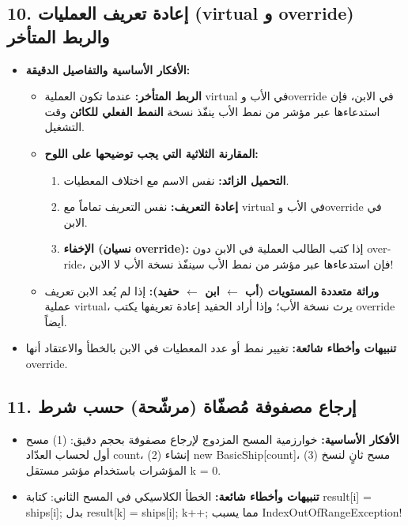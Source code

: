 \documentclass[14pt]{extarticle}
\begin{document}
\filbreak
\subsection*{10. إعادة تعريف العمليات (\textenglish{virtual} و \textenglish{override}) والربط المتأخر}
\begin{itemize}[itemsep=0.3em]
    \item \textbf{الأفكار الأساسية والتفاصيل الدقيقة:}
    \begin{itemize}
        \item \textbf{الربط المتأخر:} عندما تكون العملية \textenglish{virtual} في الأب و\textenglish{override} في الابن، فإن استدعاءها عبر مؤشر من نمط الأب ينفّذ نسخة \textbf{النمط الفعلي للكائن} وقت التشغيل.
        \item \textbf{المقارنة الثلاثية التي يجب توضيحها على اللوح:}
        \begin{enumerate}
            \item \textbf{التحميل الزائد:} نفس الاسم مع اختلاف المعطيات.
            \item \textbf{إعادة التعريف:} نفس التعريف تماماً مع \textenglish{virtual} في الأب و\textenglish{override} في الابن.
            \item \textbf{الإخفاء (نسيان \textenglish{override}):} إذا كتب الطالب العملية في الابن دون \textenglish{override}، فإن استدعاءها عبر مؤشر من نمط الأب سينفّذ نسخة الأب لا الابن!
        \end{enumerate}
        \item \textbf{وراثة متعددة المستويات (أب $\leftarrow$ ابن $\leftarrow$ حفيد):} إذا لم يُعد الابن تعريف عملية \textenglish{virtual}، يرث نسخة الأب؛ وإذا أراد الحفيد إعادة تعريفها يكتب \textenglish{override} أيضاً.
    \end{itemize}
    \item \textbf{تنبيهات وأخطاء شائعة:} تغيير نمط أو عدد المعطيات في الابن بالخطأ والاعتقاد أنها \textenglish{override}.
\end{itemize}

\filbreak
\subsection*{11. إرجاع مصفوفة مُصفّاة (مرشّحة) حسب شرط}
\begin{itemize}[itemsep=0.3em]
    \item \textbf{الأفكار الأساسية:} خوارزمية المسح المزدوج لإرجاع مصفوفة بحجم دقيق: (1) مسح أول لحساب العدّاد \textenglish{count}، (2) إنشاء \textenglish{new BasicShip[count]}، (3) مسح ثانٍ لنسخ المؤشرات باستخدام مؤشر مستقل \textenglish{k = 0}.
    \item \textbf{تنبيهات وأخطاء شائعة:} الخطأ الكلاسيكي في المسح الثاني: كتابة \textenglish{result[i] = ships[i];} بدل \textenglish{result[k] = ships[i]; k++;} مما يسبب \textenglish{IndexOutOfRangeException}!
\end{itemize}
\end{document}
